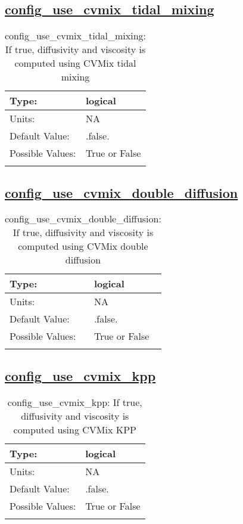 \subsection[config\_use\_cvmix\_tidal\_mixing]{\hyperref[sec:nm_tab_cvmix]{config\_use\_cvmix\_tidal\_mixing}}
\label{subsec:nm_sec_config_use_cvmix_tidal_mixing}
\begin{center}
\begin{longtable}{| p{2.0in} || p{4.0in} |}
    \hline
    Type: & logical \\
    \hline
    Units: & \si{NA} \\
    \hline
    Default Value: & .false. \\
    \hline
    Possible Values: & True or False \\
    \hline
    \caption{config\_use\_cvmix\_tidal\_mixing: If true, diffusivity and viscosity is computed using CVMix tidal mixing}
\end{longtable}
\end{center}
\subsection[config\_use\_cvmix\_double\_diffusion]{\hyperref[sec:nm_tab_cvmix]{config\_use\_cvmix\_double\_diffusion}}
\label{subsec:nm_sec_config_use_cvmix_double_diffusion}
\begin{center}
\begin{longtable}{| p{2.0in} || p{4.0in} |}
    \hline
    Type: & logical \\
    \hline
    Units: & \si{NA} \\
    \hline
    Default Value: & .false. \\
    \hline
    Possible Values: & True or False \\
    \hline
    \caption{config\_use\_cvmix\_double\_diffusion: If true, diffusivity and viscosity is computed using CVMix double diffusion}
\end{longtable}
\end{center}
\subsection[config\_use\_cvmix\_kpp]{\hyperref[sec:nm_tab_cvmix]{config\_use\_cvmix\_kpp}}
\label{subsec:nm_sec_config_use_cvmix_kpp}
\begin{center}
\begin{longtable}{| p{2.0in} || p{4.0in} |}
    \hline
    Type: & logical \\
    \hline
    Units: & \si{NA} \\
    \hline
    Default Value: & .false. \\
    \hline
    Possible Values: & True or False \\
    \hline
    \caption{config\_use\_cvmix\_kpp: If true, diffusivity and viscosity is computed using CVMix KPP}
\end{longtable}
\end{center}
